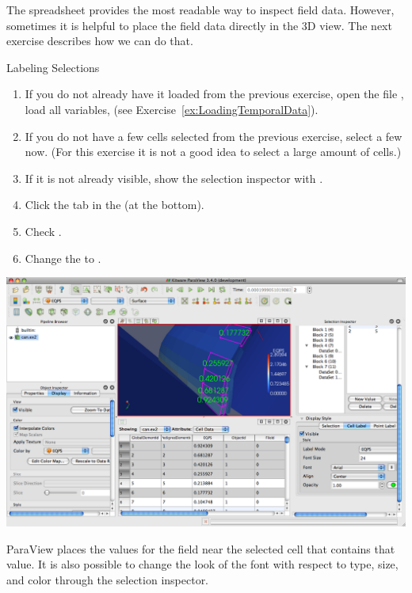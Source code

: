 The spreadsheet provides the most readable way to inspect field data.
However, sometimes it is helpful to place the field data directly in the 3D
view.  The next exercise describes how we can do that.

\begin{exercise}{Labeling Selections}
  \label{ex:LabelingSelections}%
  \begin{enumerate}
  \item If you do not already have it loaded from the previous exercise,
    open the file , load all variables, \apply (see
    Exercise~\ref{ex:LoadingTemporalData}).
  \item If you do not have a few cells selected from the previous exercise,
    select a few now. (For this exercise it is not a good idea to select a
    large amount of cells.)
  \item If it is not already visible, show the selection inspector
    with  \ra {}.
  \item Click the  tab in the  (at
    the bottom).
  \item Check .
  \item Change the  to .
  \end{enumerate}

  \begin{inlinefig}
    \includegraphics[width=\scw]{images/SpreadsheetSelection}
  \end{inlinefig}

  ParaView places the values for the  field near the selected
  cell that contains that value.  It is also possible to change the look of
  the font with respect to type, size, and color through the selection
  inspector.
\end{exercise}

